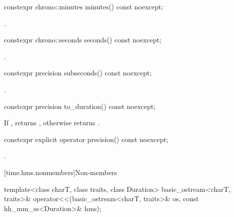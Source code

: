 %
\begin{itemdecl}
constexpr chrono::minutes minutes() const noexcept;
\end{itemdecl}

\begin{itemdescr}
\pnum
\returns
{}.
\end{itemdescr}

%
\begin{itemdecl}
constexpr chrono::seconds seconds() const noexcept;
\end{itemdecl}

\begin{itemdescr}
\pnum
\returns
{}.
\end{itemdescr}

%
\begin{itemdecl}
constexpr precision subseconds() const noexcept;
\end{itemdecl}

\begin{itemdescr}
\pnum
\returns
{}.
\end{itemdescr}

%
\begin{itemdecl}
constexpr precision to_duration() const noexcept;
\end{itemdecl}

\begin{itemdescr}
\pnum
\returns
If , returns ,
otherwise returns .
\end{itemdescr}

%
\begin{itemdecl}
constexpr explicit operator precision() const noexcept;
\end{itemdecl}

\begin{itemdescr}
\pnum
\returns
{}.
\end{itemdescr}

[time.hms.nonmembers]{Non-members}

\begin{itemdecl}
template<class charT, class traits, class Duration>
  basic_ostream<charT, traits>&
    operator<<(basic_ostream<charT, traits>& os, const hh_mm_ss<Duration>& hms);
\end{itemdecl}

